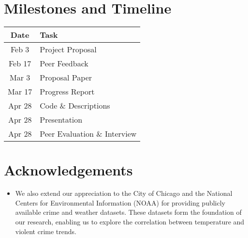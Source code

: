 \documentclass[sigconf,twocolumn,11pt]{acmart}
\begin{document}
\section{Milestones and Timeline}
\begin{table}[H]
    \centering
    \begin{tabular}{|c|l|}
        \hline
        \textbf{Date} & \textbf{Task} \\
        \hline
        Feb 3 & Project Proposal \\
        Feb 17 & Peer Feedback \\
        Mar 3 & Proposal Paper \\
        Mar 17 & Progress Report \\
        Apr 28 & Code \& Descriptions \\
        Apr 28 & Presentation \\
        Apr 28 & Peer Evaluation \& Interview \\
        \hline
    \end{tabular}
\end{table}

\section{Acknowledgements}
\begin{itemize}
    \item We also extend our appreciation to the City of Chicago and the National Centers for Environmental Information (NOAA) for providing publicly available crime and weather datasets. These datasets form the foundation of our research, enabling us to explore the correlation between temperature and violent crime trends.
    
\end{itemize}
\end{document}
